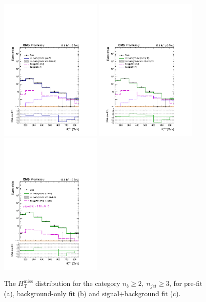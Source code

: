\clearpage
\begin{figure}[tbhp]
    \caption{ 
    The $H_{\mathrm{T}}^{\mathrm{miss}}$ distribution for the category $n_{b}\geq 2, \; n_{jet} \geq 3$, for pre-fit (a), background-only fit (b) and signal+background fit (c).
    \label{fig:mhtShape_ge2b_ge3j} }
  \begin{center}
  \includegraphics[width=0.45\textwidth]{mhtShape_ge2b_ge3j_200_Inf_prefit_aux} \hspace{1cm}
  \includegraphics[width=0.45\textwidth]{mhtShape_ge2b_ge3j_200_Inf_fit_b_aux} \\
  \includegraphics[width=0.45\textwidth]{mhtShape_ge2b_ge3j_200_Inf_fit_s_aux}
  \end{center}
\end{figure}


